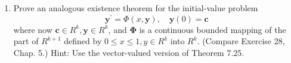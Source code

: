 \documentclass[10pt]{article}
\begin{document}
\begin{enumerate}
  (a) $\left|f_{n}^{\prime}\right| \leq M,\left|\Delta_{n}\right| \leq 2 M, \Delta_{n} \in \mathscr{R}$, and $\left|f_{n}\right| \leq|c|+M=M_{1}$, say, on $[0,1]$, for all $n$.

  (b) $\left\{f_{n}\right\}$ is equicontinuous on $[0,1]$, since $\left|f_{n}^{\prime}\right| \leq M$.

  (c) Some $\left\{f_{n_{k}}\right\}$ converges to some $f$, uniformly on $[0,1]$.

  (d) Since $\phi$ is uniformly continuous on the rectangle $0 \leq x \leq 1,|y| \leq M_{1}$,
  $$
  \phi\left(t, f_{n_{k}}(t)\right) \rightarrow \phi(t, f(t))
  $$
  uniformly on $[0,1]$.

  (e) $\Delta_{n}(t) \rightarrow 0$ uniformly on $[0,1]$, since
  $$
  \Delta_{n}(t)=\phi\left(x_{i}, f_{n}\left(x_{i}\right)\right)-\phi\left(t, f_{n}(t)\right)
  $$
  in $\left(x_{i}, x_{i+1}\right)$.

  (f) Hence
  $$
  f(x)=c+\int_{0}^{x} \phi(t, f(t)) d t
  $$
  This $f$ is a solution of the given problem.

  \item Prove an analogous existence theorem for the initial-value problem
  $$
  \mathbf{y}^{\prime}=\Phi(x, \mathbf{y}), \quad \mathbf{y}(0)=\mathbf{c}
  $$
  where now $\mathbf{c} \in R^{k}, \mathbf{y} \in R^{k}$, and $\boldsymbol{\Phi}$ is a continuous bounded mapping of the part of $R^{k+1}$ defined by $0 \leq x \leq 1, y \in R^{k}$ into $R^{k}$. (Compare Exercise 28, Chap. 5.) Hint: Use the vector-valued version of Theorem 7.25.
\end{enumerate}
\end{document}
